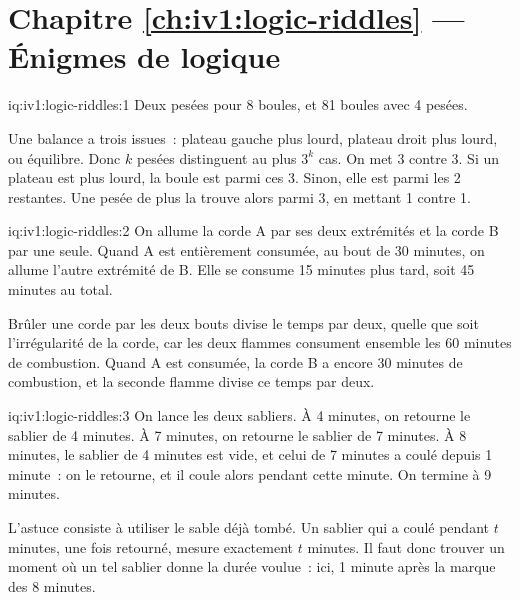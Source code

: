 \section*{Chapitre \ref{ch:iv1:logic-riddles} --- Énigmes de logique}

\begin{solution}{iq:iv1:logic-riddles:1}
Deux pesées pour 8 boules, et 81 boules avec 4 pesées.

Une balance a trois issues~: plateau gauche plus lourd, plateau droit plus lourd, ou équilibre. Donc $k$ pesées distinguent au plus $3^k$ cas. On met 3 contre 3. Si un plateau est plus lourd, la boule est parmi ces 3. Sinon, elle est parmi les 2 restantes. Une pesée de plus la trouve alors parmi 3, en mettant 1 contre 1.

\end{solution}

\begin{solution}{iq:iv1:logic-riddles:2}
On allume la corde A par ses deux extrémités et la corde B par une seule. Quand A est entièrement consumée, au bout de 30 minutes, on allume l'autre extrémité de B. Elle se consume 15 minutes plus tard, soit 45 minutes au total.

Brûler une corde par les deux bouts divise le temps par deux, quelle que soit l'irrégularité de la corde, car les deux flammes consument ensemble les 60 minutes de combustion. Quand A est consumée, la corde B a encore 30 minutes de combustion, et la seconde flamme divise ce temps par deux.

\end{solution}

\begin{solution}{iq:iv1:logic-riddles:3}
On lance les deux sabliers. À 4 minutes, on retourne le sablier de 4 minutes. À 7 minutes, on retourne le sablier de 7 minutes. À 8 minutes, le sablier de 4 minutes est vide, et celui de 7 minutes a coulé depuis 1 minute~: on le retourne, et il coule alors pendant cette minute. On termine à 9 minutes.

L'astuce consiste à utiliser le sable déjà tombé. Un sablier qui a coulé pendant $t$ minutes, une fois retourné, mesure exactement $t$ minutes. Il faut donc trouver un moment où un tel sablier donne la durée voulue~: ici, 1 minute après la marque des 8 minutes.

\end{solution}

